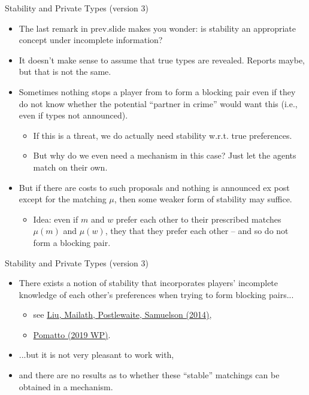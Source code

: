 \documentclass[english,10pt
,aspectratio=169
]{beamer}
\begin{document}
\begin{frame}{Stability and Private Types (version 3)}
\begin{itemize}
	\item The last remark in prev.slide makes you wonder: is stability an appropriate concept under incomplete information?
	\item It doesn't make sense to assume that true types are revealed. Reports maybe, but that is not the same.
	\item Sometimes nothing stops a player from  to form a blocking pair even if they do not know whether the potential ``partner in crime'' would want this (i.e., even if types not announced).
	\begin{itemize}
		\item If this is a threat, we do actually need stability w.r.t. true preferences.
		\item But why do we even need a mechanism in this case? Just let the agents match on their own.
	\end{itemize}
	\item But if there are costs to such proposals and nothing is announced ex post except for the matching $\mu$, then some weaker form of stability may suffice.
	\begin{itemize}
		\item Idea: even if $m$ and $w$ prefer each other to their prescribed matches $\mu(m)$ and $\mu(w)$, they  that they prefer each other -- and so do not form a blocking pair.
	\end{itemize}
\end{itemize}
\end{frame}


\begin{frame}{Stability and Private Types (version 3)}
\begin{itemize}
	\item There exists a notion of stability that incorporates players' incomplete knowledge of each other's preferences when trying to form blocking pairs...
	\begin{itemize}
		\item see \href{https://onlinelibrary.wiley.com/doi/abs/10.3982/ECTA11183}{Liu, Mailath, Postlewaite, Samuelson (2014)},
		\item \href{http://www.its.caltech.edu/~lpomatto/stable_matching.pdf}{Pomatto (2019 WP)}.
	\end{itemize}
	\item ...but it is not very pleasant to work with,
	\item and there are no results as to whether these ``stable'' matchings can be obtained in a mechanism.
\end{itemize}
\end{frame}
\end{document}
